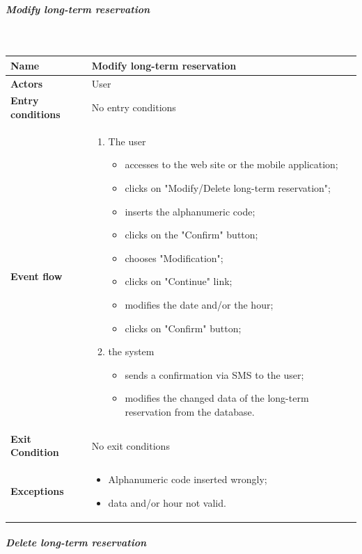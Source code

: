 \newpage
\subparagraph{Modify long-term reservation}
~\\[0.2cm]
\vspace{20pt}
\noindent
\begin{tabular}{l l}
 \textbf {Name} & Modify long-term reservation  \\ \hline
 \textbf{Actors} & User \\ \hline
 \textbf{Entry conditions} & No entry conditions \\ \hline
 \textbf{Event flow} & 
 \parbox{0.7\textwidth}{
 \begin{enumerate}
 \item The user
 \begin{itemize}
 \item accesses to the web site or the mobile application;
 \item clicks on "Modify/Delete long-term reservation";
 \item inserts the alphanumeric code;
 \item clicks on the "Confirm" button;
 \item chooses "Modification";
 \item clicks on "Continue" link;
 \item modifies the date and/or the hour;
 \item clicks on "Confirm" button;
 \end{itemize}
 \item the system
 \begin{itemize}
 \item sends a confirmation via SMS to the user;
 \item modifies the changed data of the long-term reservation from the database.
 \end{itemize}
 \end{enumerate}
 } \\ \hline
 \textbf{Exit Condition} & No exit conditions \\ \hline
 \textbf{Exceptions} &  \parbox{0.7\textwidth}{ 
 \begin{itemize}
 \item Alphanumeric code inserted wrongly;
 \item data and/or hour not valid.
 \end{itemize}
 }
\end{tabular}
\newpage
\subparagraph{Delete long-term reservation}
~\\[0.2cm]
\vspace{20pt}
\noindent

